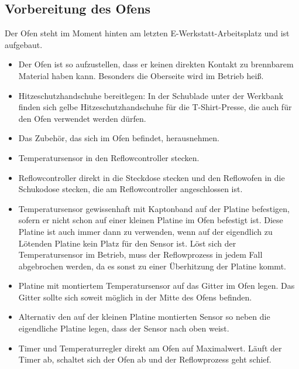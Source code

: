 \documentclass{\basedir/fablab-document}
\begin{document}
\subsection{Vorbereitung des Ofens}
Der Ofen steht im Moment hinten am letzten E-Werkstatt-Arbeitsplatz und ist aufgebaut.
\begin{itemize}
	\item Der Ofen ist so aufzustellen, dass er keinen direkten Kontakt zu brennbarem Material haben kann. Besonders die Oberseite wird im Betrieb heiß.
	\item Hitzeschutzhandschuhe bereitlegen: In der Schublade  unter der Werkbank finden sich gelbe Hitzeschutzhandschuhe für die T-Shirt-Presse, die auch für den Ofen verwendet werden dürfen.
	\item Das Zubehör, das sich im Ofen befindet, herausnehmen.
	\item Temperatursensor in den Reflowcontroller stecken.
	\item Reflowcontroller direkt in die Steckdose stecken und den Reflowofen in die Schukodose stecken, die am Reflowcontroller angeschlossen ist.
	\item Temperatursensor gewissenhaft mit Kaptonband auf der Platine befestigen, sofern er nicht schon auf einer kleinen Platine im Ofen befestigt ist. Diese Platine ist auch immer dann zu verwenden, wenn auf der eigendlich zu Lötenden Platine kein Platz für den Sensor ist. Löst sich der Temperatursensor im Betrieb, muss der Reflowprozess in jedem Fall abgebrochen werden, da es sonst zu einer Überhitzung der Platine kommt.
	\item Platine mit montiertem Temperatursensor auf das Gitter im Ofen legen. Das Gitter sollte sich soweit möglich in der Mitte des Ofens befinden.
	\item Alternativ den auf der kleinen Platine montierten Sensor so neben die eigendliche Platine legen, dass der Sensor nach oben weist.
	\item Timer und Temperaturregler direkt am Ofen auf Maximalwert. Läuft der Timer ab, schaltet sich der Ofen ab und der Reflowprozess geht schief.
\end{itemize}
\end{document}
